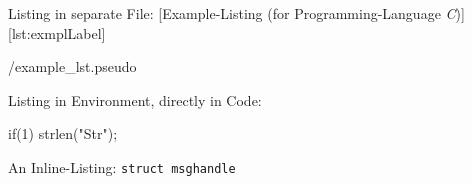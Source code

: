 \npi
Listing in separate File:
[Example-Listing (for Programming-Language \textit{C})]
[lst:exmplLabel]
%
%

{\DenKrListingsRootDir/example_lst.pseudo}

\npi
Listing in Environment, directly in Code:
\begin{DenKrLst}[language=DenKr-C]{}{}
if(1){
	strlen("Str");
}
\end{DenKrLst}

\npi
An Inline-Listing:
\lstinline[language=DenKr-C,breaklines=true,morekeywords={[4]{msghandle}}]$struct msghandle$



%
%
%